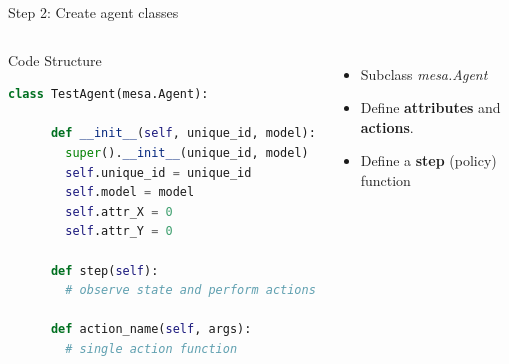 \documentclass{beamer}
\begin{document}
\begin{frame}[fragile]{Step 2: Create agent classes}
    \begin{columns}
        \begin{block}{Code Structure}
            \begin{lstlisting}[language=Python, basicstyle=\footnotesize, xleftmargin=-16pt, columns=fullflexible]
    class TestAgent(mesa.Agent):
      
      def __init__(self, unique_id, model):
        super().__init__(unique_id, model)
        self.unique_id = unique_id
        self.model = model
        self.attr_X = 0
        self.attr_Y = 0
        
      def step(self):
        # observe state and perform actions
      
      def action_name(self, args):
        # single action function
    
    \end{lstlisting}
        \end{block}

        \begin{itemize}
            \item Subclass \textit{mesa.Agent}
            \item Define \textbf{attributes} and \textbf{actions}.
            \item Define a \textbf{step} (policy) function
        \end{itemize}
    \end{columns}

\end{frame}
\end{document}
